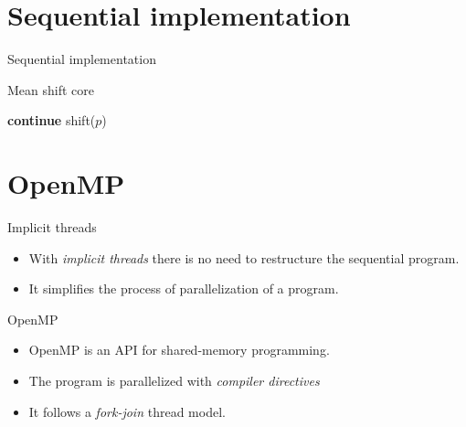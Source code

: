\documentclass{beamer}
\begin{document}
\section{Sequential implementation}


\begin{frame}{Sequential implementation}

\begin{algorithm}[H]
\caption{Mean shift core}
\begin{algorithmic}[1]

                    \State \textbf{continue}
                \EndIf
            \State shift($p$)
            \EndFor
    \EndWhile

\end{algorithmic}
\end{algorithm}

\end{frame}


\section{OpenMP}


\begin{frame}{Implicit threads}

\begin{itemize}
\item
With \textit{implicit threads} there is no need to restructure the sequential program.

\item
It simplifies the process of parallelization of a program.
\end{itemize}

\end{frame}


\begin{frame}{OpenMP}

\begin{itemize}
\item
OpenMP is an API for shared-memory programming.

\item
The program is parallelized with \textit{compiler directives}

\item
It follows a \textit{fork-join} thread model.
\end{itemize}

\end{frame}
\end{document}
